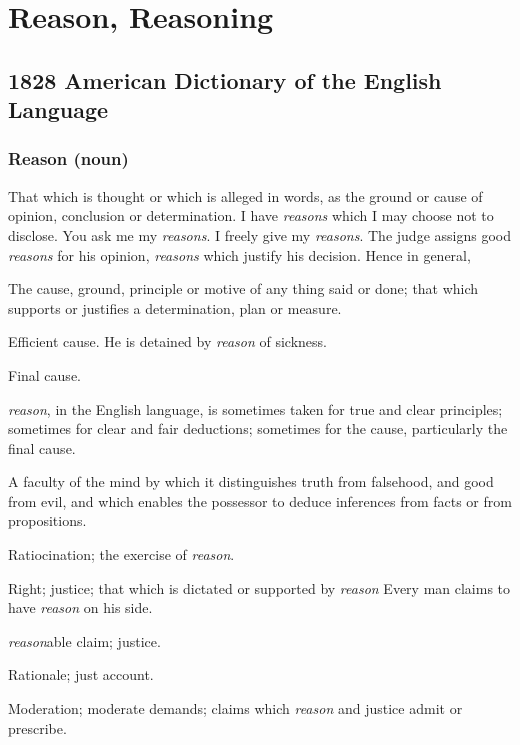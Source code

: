 \section{Reason, Reasoning}
	\label{REASON}
	

\subsection{1828 American Dictionary of the English Language} %
	\label{REASON-1828}
	
	\subsubsection{Reason (noun)}

		\begin{compactitem}
			\item[1] That which is thought or which is alleged in words, as the ground or cause of opinion, conclusion or determination. I have \textit{reasons} which I may choose not to disclose. You ask me my \textit{reasons}. I freely give my \textit{reasons}. The judge assigns good \textit{reasons} for his opinion, \textit{reasons} which justify his decision. Hence in general,
			\item[2] The cause, ground, principle or motive of any thing said or done; that which supports or justifies a determination, plan or measure.
			\item[3] Efficient cause. He is detained by \textit{reason} of sickness.
			\item[4] Final cause.
			\item \textit{reason}, in the English language, is sometimes taken for true and clear principles; sometimes for clear and fair deductions; sometimes for the cause, particularly the final cause.
			\item[5] A faculty of the mind by which it distinguishes truth from falsehood, and good from evil, and which enables the possessor to deduce inferences from facts or from propositions.
			\item[6] Ratiocination; the exercise of \textit{reason}.
			\item[7] Right; justice; that which is dictated or supported by \textit{reason} Every man claims to have \textit{reason} on his side.
			\item[8] \textit{reason}able claim; justice.
			\item[9] Rationale; just account.
			\item[10] Moderation; moderate demands; claims which \textit{reason} and justice admit or prescribe.
		\end{compactitem}
		
